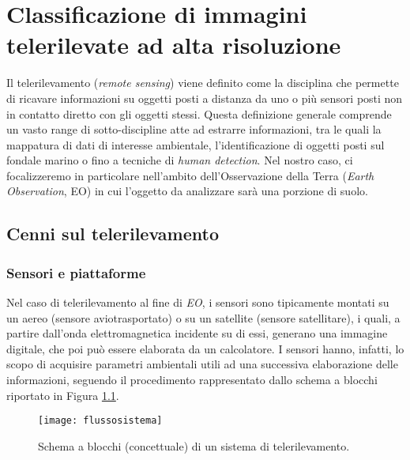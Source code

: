 
\chapter{Classificazione di immagini telerilevate ad alta risoluzione} 
\label{cap:telerilevamento} 

Il telerilevamento (\emph{remote sensing}) viene definito come la disciplina che permette di ricavare informazioni su oggetti posti a distanza da uno o più sensori posti non in contatto diretto con gli oggetti stessi.
Questa definizione generale comprende un vasto range di sotto-discipline atte ad estrarre informazioni, tra le quali la mappatura di dati di interesse ambientale, l'identificazione di oggetti posti sul fondale marino o fino a tecniche di \emph{human detection}.
Nel nostro caso, ci focalizzeremo in particolare nell'ambito dell'Osservazione della Terra (\emph{Earth Observation}, EO) in cui l'oggetto da analizzare sarà una porzione di suolo.
\clearpage


\section{Cenni sul telerilevamento}


\subsection{Sensori e piattaforme}
Nel caso di telerilevamento al fine di \emph{EO}, i sensori sono tipicamente montati su un aereo (sensore aviotrasportato) o su un satellite (sensore satellitare), i quali, a partire dall'onda elettromagnetica incidente su di essi, generano una immagine digitale, che poi può essere elaborata da un calcolatore. 
I sensori hanno, infatti, lo scopo di acquisire parametri ambientali utili ad una successiva elaborazione delle informazioni, seguendo il procedimento rappresentato dallo schema a blocchi riportato in Figura \ref{fig:flussosistema}.

\begin{figure}[!ht]
\texttt{[image: flussosistema]}
\caption{Schema a blocchi (concettuale) di un sistema di telerilevamento.}
\label{fig:flussosistema}
\end{figure}

